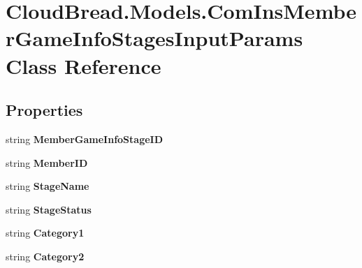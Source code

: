 \hypertarget{a00049}{}\section{Cloud\+Bread.\+Models.\+Com\+Ins\+Member\+Game\+Info\+Stages\+Input\+Params Class Reference}
\label{a00049}
\subsection*{Properties}
\begin{DoxyCompactItemize}
\item 
string {\bfseries Member\+Game\+Info\+Stage\+ID}\hypertarget{a00049_a5ea1150273c769d9533d51258e30c461}{}\label{a00049_a5ea1150273c769d9533d51258e30c461}

\item 
string {\bfseries Member\+ID}\hypertarget{a00049_a7770edc46f030003470b81f465df747d}{}\label{a00049_a7770edc46f030003470b81f465df747d}

\item 
string {\bfseries Stage\+Name}\hypertarget{a00049_a30c614df7f420724e40559c77c5c9c82}{}\label{a00049_a30c614df7f420724e40559c77c5c9c82}

\item 
string {\bfseries Stage\+Status}\hypertarget{a00049_aec175115a74e99273848c062995dc3d7}{}\label{a00049_aec175115a74e99273848c062995dc3d7}

\item 
string {\bfseries Category1}\hypertarget{a00049_a541aa1b74364eb30b0cc5e0fb7c9ec43}{}\label{a00049_a541aa1b74364eb30b0cc5e0fb7c9ec43}

\item 
string {\bfseries Category2}\hypertarget{a00049_a902fb0a3b958023254e9ea8cf64f2e28}{}\label{a00049_a902fb0a3b958023254e9ea8cf64f2e28}


\end{DoxyCompactItemize}
